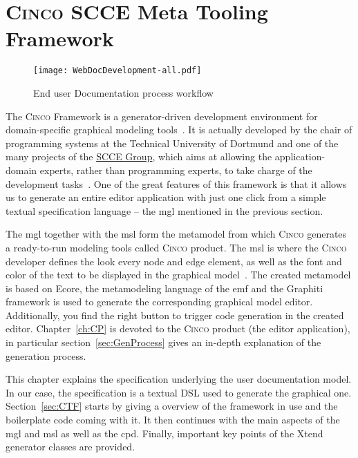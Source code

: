 \section{\textsc{Cinco SCCE} Meta Tooling Framework}\label{sec:cincoFW}

\begin{figure}[h]
    \centering
    \texttt{[image: WebDocDevelopment-all.pdf]}
    \caption{End user Documentation process workflow}
    \label{}
\end{figure}

The \textsc{Cinco} Framework is a generator-driven development environment for domain-specific graphical modeling tools~\cite{Cinco}. It is actually developed by the chair of programming systems at the Technical University of Dortmund and one of the many projects of the \href{https://www.scce.info/}{SCCE Group}, which aims at allowing the application-domain experts, rather than programming experts, to take charge of the development tasks~\cite{scce}. One of the great features of this framework is that it allows us to generate an entire editor application with just one click from a simple textual specification language -- the \acrshort{mgl} mentioned in the previous section. 

The \acrshort{mgl} together with the \acrshort{msl} form the metamodel from which \textsc{Cinco} generates a ready-to-run modeling tools called \textsc{Cinco} product. The \acrshort{msl} is where the \textsc{Cinco} developer defines the look every node and edge element, as well as the font and color of the text to be displayed in the graphical model~\cite{naujokat-diss}. The created metamodel is based on Ecore, the metamodeling language of the \acrfull{emf} and the Graphiti framework is used to generate the corresponding graphical model editor. Additionally, you find the right button to trigger code generation in the created editor. Chapter~\ref{ch:CP} is devoted to the \textsc{Cinco} product (the editor application), in particular section~\ref{sec:GenProcess} gives an in-depth explanation of the generation process.

This chapter explains the specification underlying the user documentation model.  In our case, the specification is a textual DSL used to generate the graphical one. Section~\ref{sec:CTF} starts by giving a overview of the framework in use and the boilerplate code coming with it. It then continues with the main aspects of the \acrfull{mgl} and \acrfull{msl} as well as the \acrfull{cpd}. Finally, important key points of the Xtend generator classes are provided.


